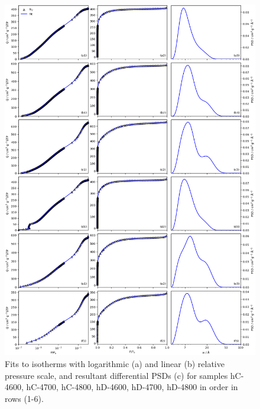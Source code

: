 \begin{figure}[p]
    \centering
    \includegraphics[width=\columnwidth, keepaspectratio]{4-cbs/figs/CB-4TTT_isopsd.png}
    \caption{Fits to  isotherms with logarithmic (a) and linear (b) relative pressure scale, and resultant differential PSDs (c) for samples hC-4600, hC-4700, hC-4800, hD-4600, hD-4700, hD-4800 in order in rows (1-6).}
    \label{fig:4TTT_psdisofull}
\end{figure}

